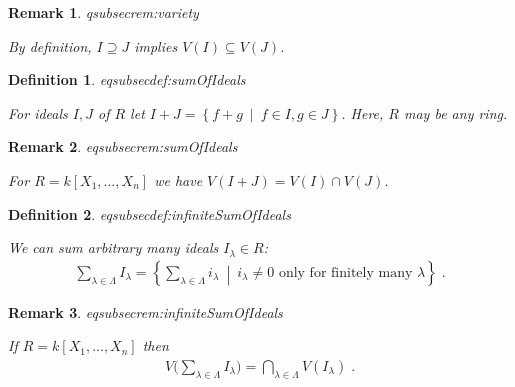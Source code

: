 \documentclass[DIV=14,parskip=full,pointednumbers]{scrartcl}
\theoremstyle{cthm}
\theoremstyle{cvarthm}
\theoremstyle{cdef}
\newtheorem{defi}{Definition}[subsection]
\newtheorem{rem}{Remark}[subsection]
\newcommand{\lbl}[1]{
	\label{#1}
	\ifmmode
	\expandafter\xdef\csname eqsubsec#1\endcsname{\thesubsection}
	\fi
}
\newcommand{\st}{\ \middle|\ }
\begin{document}
	\begin{rem}\lbl{rem:variety}
		By definition, $I\supseteq J$ implies $V(I)\subseteq V(J)$.
	\end{rem}
	\begin{defi}\lbl{def:sumOfIdeals}
		For ideals $I,J$ of $R$ let $I+J =\left\{f+g\st f\in I, g\in J\right\}$. Here, $R$ may be any ring.
	\end{defi}
	\begin{rem}\lbl{rem:sumOfIdeals}
		For $R=k[X_1,\ldots,X_n]$ we have $V(I+J) = V(I)\cap V(J)$.
	\end{rem}
	\begin{defi}\lbl{def:infiniteSumOfIdeals}
		We can sum arbitrary many ideals $I_\lambda\in R$:
		\begin{align*}
		\sum_{\lambda\in\Lambda}I_\lambda = \left\{\sum_{\lambda\in\Lambda} i_\lambda \st i_\lambda \neq 0 \text{ only for finitely many }\lambda\right\}\;.
		\end{align*}
		
	\end{defi}
	\begin{rem}\lbl{rem:infiniteSumOfIdeals}
		If $R=k[X_1,\ldots,X_n]$ then 
		\begin{align*}
		V\bigg(\sum_{\lambda\in \Lambda} I_\lambda\bigg) = \bigcap_{\lambda\in\Lambda} V(I_\lambda)\;.
		\end{align*}
	\end{rem}
	
\end{document}
